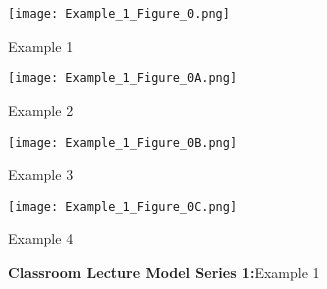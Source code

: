 \documentclass{ResumeDesignFormat1}
\begin{document}



\footnotesize
\begin{figure}[h]
	\centering
	\begin{minipage}[b]{0.5\linewidth}
		\texttt{[image: Example\_1\_Figure\_0.png]}
		\caption{\footnotesize Example 1 }
		\label{fig:FigureA}
	\end{minipage}\hfill
	\begin{minipage}[b]{0.5\linewidth}
		\texttt{[image: Example\_1\_Figure\_0A.png]}
		\caption{\footnotesize Example 2}
		\label{fig:FigureB}
	\end{minipage}\hfill
	\begin{minipage}[b]{0.5\linewidth}
		\texttt{[image: Example\_1\_Figure\_0B.png]}
		\caption{\footnotesize Example 3}
		\label{fig:FigureC}
	\end{minipage}\hfill
	\begin{minipage}[b]{0.5\linewidth}
		\texttt{[image: Example\_1\_Figure\_0C.png]}
		\caption{\footnotesize Example 4}
		\label{fig:FigureD}
	\end{minipage}\hfill
	\caption{\textcolor{c5}{\textbf{Classroom Lecture Model Series 1:}}\footnotesize Example 1 }
	\label{fig:Figure1}
\end{figure}
\end{document}
